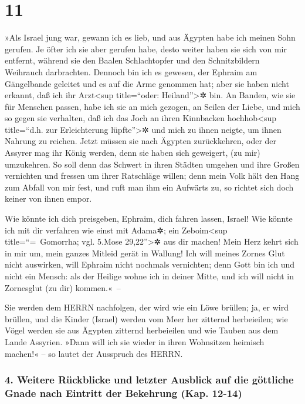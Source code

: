 \hypertarget{section-10}{%
\section{11}\label{section-10}}

 »Als Israel jung war, gewann ich es lieb, und aus Ägypten
habe ich meinen Sohn gerufen.  Je öfter ich sie aber
gerufen habe, desto weiter haben sie sich von mir entfernt, während sie
den Baalen Schlachtopfer und den Schnitzbildern Weihrauch darbrachten.
 Dennoch bin ich es gewesen, der Ephraim am Gängelbande
geleitet und es auf die Arme genommen hat; aber sie haben nicht erkannt,
daß ich ihr Arzt\textless sup title=``oder: Heiland''\textgreater✲ bin.
 An Banden, wie sie für Menschen passen, habe ich sie an
mich gezogen, an Seilen der Liebe, und mich so gegen sie verhalten, daß
ich das Joch an ihren Kinnbacken hochhob\textless sup title=``d.h. zur
Erleichterung lüpfte''\textgreater✲ und mich zu ihnen neigte, um ihnen
Nahrung zu reichen.  Jetzt müssen sie nach Ägypten
zurückkehren, oder der Assyrer mag ihr König werden, denn sie haben sich
geweigert, (zu mir) umzukehren.  So soll denn das Schwert
in ihren Städten umgehen und ihre Großen vernichten und fressen um ihrer
Ratschläge willen;  denn mein Volk hält den Hang zum
Abfall von mir fest, und ruft man ihm ein Aufwärts zu, so richtet sich
doch keiner von ihnen empor.

 Wie könnte ich dich preisgeben, Ephraim, dich fahren
lassen, Israel! Wie könnte ich mit dir verfahren wie einst mit Adama✲;
ein Zeboim\textless sup title=``=~Gomorrha; vgl. 5.Mose
29,22''\textgreater✲ aus dir machen! Mein Herz kehrt sich in mir um,
mein ganzes Mitleid gerät in Wallung!  Ich will meines
Zornes Glut nicht auswirken, will Ephraim nicht nochmals vernichten;
denn Gott bin ich und nicht ein Mensch: als der Heilige wohne ich in
deiner Mitte, und ich will nicht in Zornesglut (zu dir) kommen.«~--

 Sie werden dem HERRN nachfolgen, der wird wie ein Löwe
brüllen; ja, er wird brüllen, und die Kinder (Israel) werden vom Meer
her zitternd herbeieilen;  wie Vögel werden sie aus
Ägypten zitternd herbeieilen und wie Tauben aus dem Lande Assyrien.
»Dann will ich sie wieder in ihren Wohnsitzen heimisch machen!« -- so
lautet der Ausspruch des HERRN.

\hypertarget{weitere-ruxfcckblicke-und-letzter-ausblick-auf-die-guxf6ttliche-gnade-nach-eintritt-der-bekehrung-kap.-12-14}{%
\subsubsection{4. Weitere Rückblicke und letzter Ausblick auf die
göttliche Gnade nach Eintritt der Bekehrung (Kap.
12-14)}\label{weitere-ruxfcckblicke-und-letzter-ausblick-auf-die-guxf6ttliche-gnade-nach-eintritt-der-bekehrung-kap.-12-14}}

